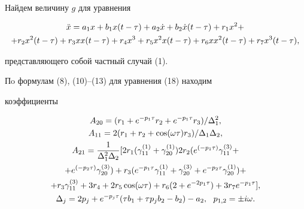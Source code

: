 \begin{exam} 


Найдем величину $g$ для уравнения 


\begin{multline} 


\Ddot x=a_1x+b_1x(t-\tau)+a_2\Dot x+b_2\Dot x(t-\tau)+ 


r_1x^2+ \\ 


% 


+r_2x^2(t-\tau)+r_3x x(t-\tau)+r_4x^3+r_5x^2x(t-\tau)+ 


r_6x x^2(t-\tau)+r_7x^3(t-\tau), 


\end{multline} 


представляющего собой частный случай (1). 


 


Пo формулам (8), (10)--(13) для уравнения (18) находим 


коэффициенты 


\begin{gather} 


A_{20}=(r_1+e^{-p_1\tau}r_2+e^{-p_1\tau}r_3)/\Delta^2_1,\notag \\ 


% 


A_{11}=2(r_1+r_2+\cos(\omega\tau)r_3)/\Delta_1\Delta_2, \\ 


% 


A_{21}=\frac{1}{\Delta^2_1\Delta_2}[2r_1(\gamma^{(1)}_{11} 


+\gamma^{(1)}_{20})2r_2(e^{(-p_1\tau)}\gamma^{(3)}_{11}+\notag \\ 


+e^{(-p_2\tau)}\gamma^{(3)}_{20})+ 


r_3(e^{-p_1\tau}\gamma^{(1)}_{11}+\gamma^{(3)}_{20} 


+e^{-p_2\tau}\gamma^{(1)}_{20})+\notag \\ 


+r_3\gamma^{(3)}_{11}+3r_4+2r_5\cos(\omega\tau)+ 


r_6(2+e^{-2p_1\tau})+3r_7 e^{-p_1\tau}], \\ 


% 


\Delta_j=2p_j+e^{-p_j\tau}(\tau b_1+\tau p_j b_2-b_2)-a_2, 


\ \ p_{1,2}=\pm i\omega. 


\end{gather} 



\end{exam}
